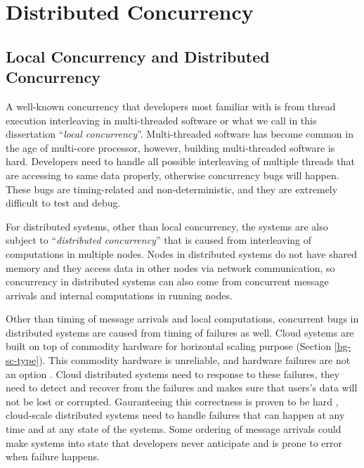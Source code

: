 \section{Distributed Concurrency}
\label{bg-dc}

\subsection{Local Concurrency and Distributed Concurrency}



A well-known concurrency that developers most familiar with is from thread
execution interleaving in multi-threaded software or what we call in this
dissertation ``\textit{local concurrency}''. Multi-threaded software has become
common in the age of multi-core processor, however, building multi-threaded
software is hard. Developers need to handle all possible interleaving of
multiple threads that are accessing to same data properly, otherwise
concurrency bugs will happen. These bugs are timing-related and
non-deterministic, and they are extremely difficult to test and debug.

For distributed systems, other than local concurrency, the systems are also
subject to ``\textit{distributed concurrency}'' that is caused from
interleaving of computations in multiple nodes. Nodes in distributed systems do
not have shared memory and they access data in other nodes via network
communication, so concurrency in distributed systems can also come from
concurrent message arrivals and internal computations in running nodes.

Other than timing of message arrivals and local computations, concurrent bugs
in distributed systems are caused from timing of failures as well. Cloud
systems are built on top of commodity hardware for horizontal scaling purpose
(Section \ref{bg-sc-type}). This commodity hardware is unreliable, and hardware
failures are not an option \cite{Abadi09-Cloud, Gunawi+11-FaaS-TR,
Hamilton07-Deploying}. Cloud distributed systems need to response to these
failures, they need to detect and recover from the failures and makes sure that
users's data will not be lost or corrupted. Gauranteeing this correctness is
proven to be hard \cite{Do+14-Phd, Gunawi+11-FateDestini}, cloud-scale
distributed systems need to handle failures that can happen at any time and at
any state of the systems. Some ordering of message arrivals could make systems
into state that developers never anticipate and is prone to error when failure
happens.

